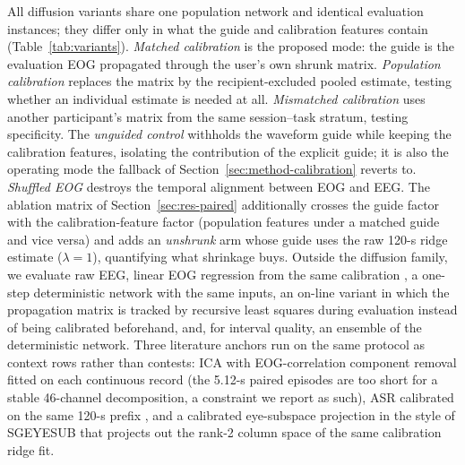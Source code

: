 All diffusion variants share one population network and identical evaluation instances; they differ only in what the guide and calibration features contain (Table~\ref{tab:variants}). \emph{Matched calibration} is the proposed mode: the guide is the evaluation EOG propagated through the user's own shrunk matrix. \emph{Population calibration} replaces the matrix by the recipient-excluded pooled estimate, testing whether an individual estimate is needed at all. \emph{Mismatched calibration} uses another participant's matrix from the same session--task stratum, testing specificity. The \emph{unguided control} withholds the waveform guide while keeping the calibration features, isolating the contribution of the explicit guide; it is also the operating mode the fallback of Section~\ref{sec:method-calibration} reverts to. \emph{Shuffled EOG} destroys the temporal alignment between EOG and EEG. The ablation matrix of Section~\ref{sec:res-paired} additionally crosses the guide factor with the calibration-feature factor (population features under a matched guide and vice versa) and adds an \emph{unshrunk} arm whose guide uses the raw 120-s ridge estimate ($\lambda=1$), quantifying what shrinkage buys. Outside the diffusion family, we evaluate raw EEG, linear EOG regression from the same calibration \cite{gratton1983ocular}, a one-step deterministic network with the same inputs, an on-line variant in which the propagation matrix is tracked by recursive least squares during evaluation instead of being calibrated beforehand, and, for interval quality, an ensemble of the deterministic network. Three literature anchors run on the same protocol as context rows rather than contests: ICA with EOG-correlation component removal \cite{jung2000bss,pion2019iclabel} fitted on each continuous record (the 5.12-s paired episodes are too short for a stable 46-channel decomposition, a constraint we report as such), ASR calibrated on the same 120-s prefix \cite{mullen2015asr,chang2020asr}, and a calibrated eye-subspace projection in the style of SGEYESUB \cite{kobler2020sgeyesub} that projects out the rank-2 column space of the same calibration ridge fit.


